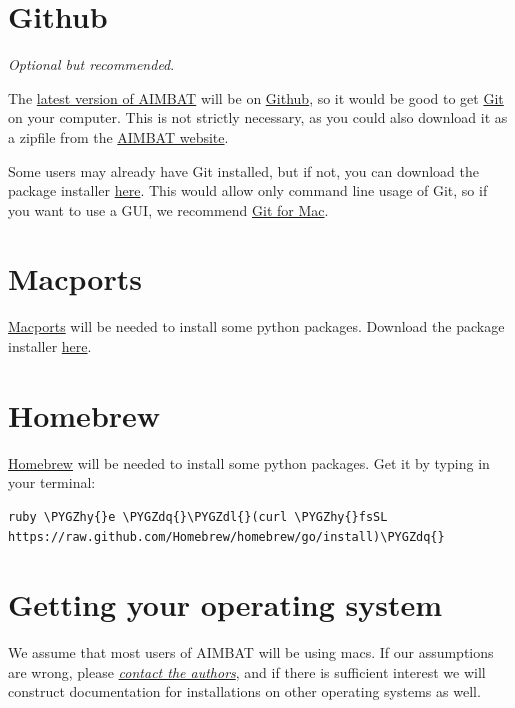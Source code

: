 \documentclass[letterpaper,10pt,english]{sphinxmanual}
\def\PYGZdl{\char`\$}
\def\PYGZhy{\char`\-}
\def\PYGZdq{\char`\"}
\begin{document}
\section{Github}
\label{docfiles/install_dependencies:github}
\emph{Optional but recommended}.

The \href{https://github.com/pysmo}{latest version of AIMBAT} will be on \href{https://github.com/}{Github}, so it would be good to get \href{https://github.com/}{Git} on your computer. This is not strictly necessary, as you could also download it as a zipfile from the \href{http://www.earth.northwestern.edu/~xlou/aimbat.html}{AIMBAT website}.

Some users may already have Git installed, but if not, you can download the package installer \href{http://git-scm.com/download/mac}{here}. This would allow only command line usage of Git, so if you want to use a GUI, we recommend \href{https://mac.github.com/}{Git for Mac}.


\section{Macports}
\label{docfiles/install_dependencies:macports}
\href{http://www.macports.org/}{Macports} will be needed to install some python packages. Download the package installer \href{http://www.macports.org/install.php}{here}.


\section{Homebrew}
\label{docfiles/install_dependencies:homebrew}
\href{http://brew.sh/}{Homebrew} will be needed to install some python packages. Get it by typing in your terminal:

\begin{Verbatim}[commandchars=\\\{\}]
ruby \PYGZhy{}e \PYGZdq{}\PYGZdl{}(curl \PYGZhy{}fsSL https://raw.github.com/Homebrew/homebrew/go/install)\PYGZdq{}
\end{Verbatim}


\section{Getting your operating system}
\label{docfiles/install_dependencies:getting-your-operating-system}
We assume that most users of AIMBAT will be using macs. If our assumptions are wrong, please {\hyperref[docfiles/introduction:authors-contacts]{\emph{contact the authors}}}, and if there is sufficient interest we will construct documentation for installations on other operating systems as well.
\end{document}
